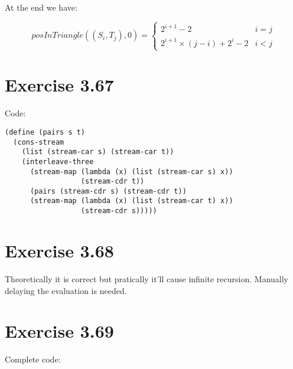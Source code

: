 \documentclass[../main.tex]{subfiles}
\begin{document}
At the end we have:

$$
posInTriangle((S_i, T_j), 0) =
\begin{cases}
2^{i+1} - 2 & i = j\\
2^{i+1}\times (j - i) + 2^i - 2 & i < j
\end{cases}
$$

\section{Exercise 3.67}

Code:

\begin{lstlisting}
(define (pairs s t)
  (cons-stream
    (list (stream-car s) (stream-car t))
    (interleave-three
      (stream-map (lambda (x) (list (stream-car s) x))
                  (stream-cdr t))
      (pairs (stream-cdr s) (stream-cdr t))
      (stream-map (lambda (x) (list (stream-car t) x))
                  (stream-cdr s)))))
\end{lstlisting}

\section{Exercise 3.68}

Theoretically it is correct but pratically it'll cause infinite recursion. Manually delaying the evaluation is needed.

\section{Exercise 3.69}

Complete code:
\end{document}

